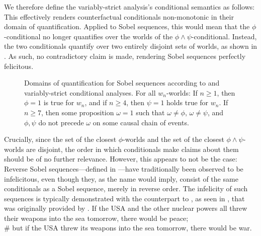 We therefore define the variably-strict analysis's conditional semantics as follows:
\ex{}
\xe
This effectively renders counterfactual conditionals non-monotonic in their domain of quantification. Applied to Sobel sequences, this would mean that the $\phi$-conditional no longer quantifies over the worlds of the $\phi\land\psi$-conditional. Instead, the two conditionals quantify over two entirely disjoint sets of worlds, as shown in . As such, no contradictory claim is made, rendering Sobel sequences perfectly felicitous.
\begin{figure}[!htb]

\caption{Domains of quantification for Sobel sequences according to \textcite{Stalnaker1968} and  variably-strict conditional analyses. For all $w_n$-worlds: If $n\geqslant1$, then $\phi=1$ is true for $w_n$, and if $n\geqslant 4$, then $\psi=1$ holds true for $w_n$. If $n\geqslant 7$, then some proposition $\omega=1$ such that $\omega\neq\phi$, $\omega\neq\psi$, and $\phi,\psi$ do not precede $\omega$ on some causal chain of events.}
\end{figure}\vspace{-3mm}

Crucially, since the set of the closest $\phi$-worlds and the set of the closest $\phi\land\psi$-worlds are disjoint, the order in which conditionals make claims about them should be of no further relevance. However, this appears to not be the case: Reverse Sobel sequences---defined in ---have traditionally been observed to be infelicitous, even though they, as the name would imply, consist of the same conditionals as a Sobel sequence, merely in reverse order. The infelicity of such sequences is typically demonstrated with the counterpart to , as seen in , that was originally provided by \textcite{Heim1994}.\vspace{-2mm}
\ex{}
\xe\vspace{-14mm}
\ex{}If the USA and the other nuclear powers all threw their weapons into the sea tomorrow, there would be peace;\\\ljudge\# but if the USA threw its weapons into the sea tomorrow, there would be war.\\\emptyfill\parencite{Heim1994}
\xe

